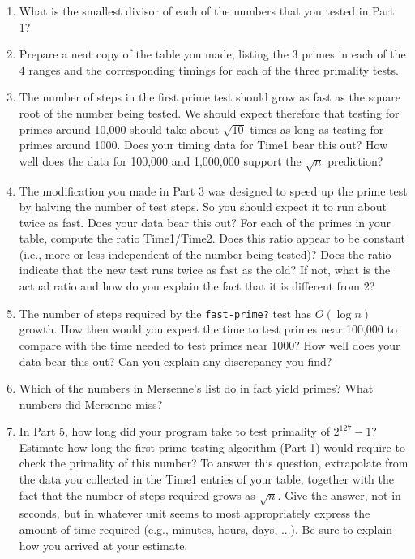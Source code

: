 \begin{enumerate}

\item What is the smallest divisor of each of the numbers 
that you tested in Part 1?

\item Prepare a neat copy of the table you made, listing the 3 primes in
each of the 4 ranges and the corresponding timings for each of the
three primality tests.

\item The number of steps in the first prime test should grow as fast as
the square root of the number being tested.  We should expect
therefore that testing for primes around 10,000 should take about
$\sqrt{10}$ times as long as testing for primes around 1000.  Does your
timing data for Time1 bear this out?  How well does the data for 100,000
and 1,000,000 support the $\sqrt{n}$ prediction?

\item The modification you made in Part 3 was designed to speed up the
prime test by halving the number of test steps.  So you should expect
it to run about twice as fast.  Does your data bear this out?  For
each of the primes in your table, compute the ratio Time1/Time2.
Does this ratio appear to be constant (i.e., more or less independent
of the number being tested)?  Does the ratio indicate that the new
test runs twice as fast as the old?  If not, what is the actual ratio
and how do you explain the fact that it is different from 2?

\item The number of steps required by the {\tt fast-prime?} test has $O(\log n)$
growth.  How then would you expect the time to test primes near
100,000 to compare with the time needed to test primes near 1000?  How
well does your data bear this out?  Can you explain any discrepancy
you find?

\item Which of the numbers in Mersenne's list do in fact yield primes?
What numbers did Mersenne miss?

\item In Part 5, how long did your program take to test primality of
$2^{127}-1$?  Estimate how long the first prime testing algorithm (Part
1) would require to check the primality of this number?  To answer
this question, extrapolate from the data you collected in the Time1
entries of your table, together with the fact that the number of steps
required grows as $\sqrt{n}$.  Give the answer, not in seconds, but
in whatever unit seems to most appropriately express the amount of
time required (e.g., minutes, hours, days, ...).  Be sure to explain
how you arrived at your estimate.


\end{enumerate}
